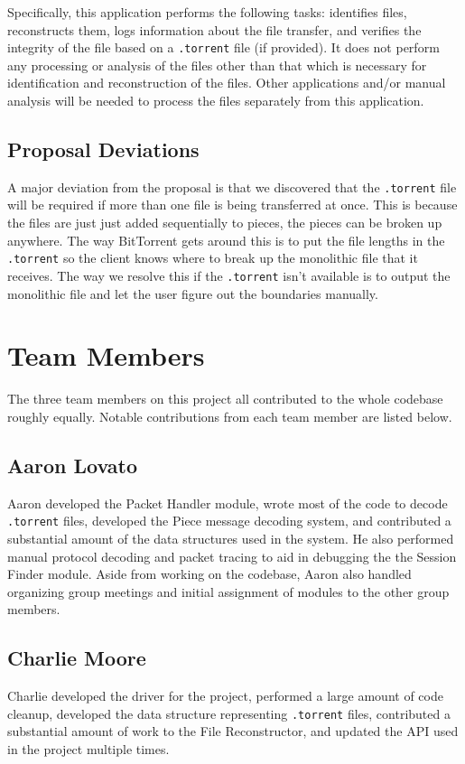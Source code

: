 \documentclass{acm_proc_article-sp}
\begin{document}
Specifically, this application performs the following tasks: identifies files,
reconstructs them, logs information about the file transfer, and verifies the
integrity of the file based on a \texttt{.torrent} file (if provided). It does
not perform any processing or analysis of the files other than that which is
necessary for identification and reconstruction of the files. Other applications
and/or manual analysis will be needed to process the files separately from this
application.

\subsection{Proposal Deviations}
A major deviation from the proposal is that we discovered that the
\texttt{.torrent} file will be required if more than one file is being
transferred at once.  This is because the files are just just added sequentially
to pieces, the pieces can be broken up anywhere.  The way BitTorrent gets around
this is to put the file lengths in the \texttt{.torrent} so the client knows
where to break up the monolithic file that it receives.  The way we resolve this
if the \texttt{.torrent} isn't available is to output the monolithic file and
let the user figure out the boundaries manually.

\section{Team Members}
The three team members on this project all contributed to the whole codebase 
roughly equally. Notable contributions from each team member are listed below.

\subsection{Aaron Lovato}
Aaron developed the Packet Handler module, wrote most of the code to decode
\texttt{.torrent} files, developed the Piece message decoding system, and
contributed a substantial amount of the data structures used in the system. He
also performed manual protocol decoding and packet tracing to aid in debugging
the the Session Finder module. Aside from working on the codebase, Aaron also
handled organizing group meetings and initial assignment of modules to the other
group members.

\subsection{Charlie Moore}
Charlie developed the driver for the project, performed a large amount of code
cleanup, developed the data structure representing \texttt{.torrent} files,
contributed a substantial amount of work to the File Reconstructor, and updated
the API used in the project multiple times.
\end{document}
